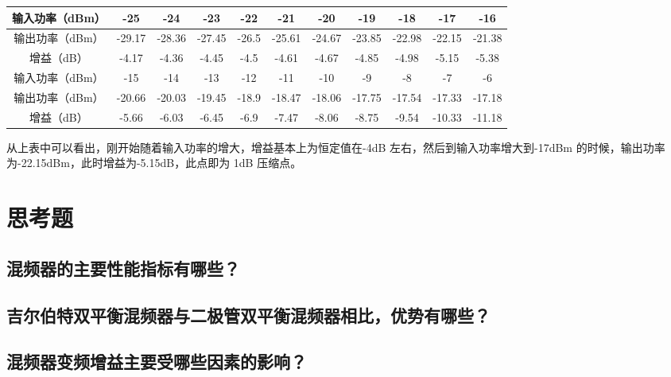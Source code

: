 \documentclass{../source/Experiment}
\begin{document}
\begin{table}[H]
    \begin{tabular}{|c|c|c|c|c|c|c|c|c|c|c|}
        \hline
        输入功率（dBm） & -25    & -24    & -23    & -22   & -21    & -20    & -19    & -18    & -17    & -16    \\ \hline
        输出功率（dBm） & -29.17 & -28.36 & -27.45 & -26.5 & -25.61 & -24.67 & -23.85 & -22.98 & -22.15 & -21.38 \\ \hline
        增益（dB）      & -4.17  & -4.36  & -4.45  & -4.5  & -4.61  & -4.67  & -4.85  & -4.98  & -5.15  & -5.38  \\ \hline
        输入功率（dBm） & -15    & -14    & -13    & -12   & -11    & -10    & -9     & -8     & -7     & -6     \\ \hline
        输出功率（dBm） & -20.66 & -20.03 & -19.45 & -18.9 & -18.47 & -18.06 & -17.75 & -17.54 & -17.33 & -17.18 \\ \hline
        增益（dB）      & -5.66  & -6.03  & -6.45  & -6.9  & -7.47  & -8.06  & -8.75  & -9.54  & -10.33 & -11.18 \\ \hline
    \end{tabular}
\end{table}

从上表中可以看出，刚开始随着输入功率的增大，增益基本上为恒定值在-4dB 左右，然后到输入功率增大到-17dBm 的时候，输出功率为-22.15dBm，此时增益为-5.15dB，此点即为 1dB 压缩点。
\section{思考题}
\subsection{混频器的主要性能指标有哪些？}

\subsection{吉尔伯特双平衡混频器与二极管双平衡混频器相比，优势有哪些？}

\subsection{混频器变频增益主要受哪些因素的影响？}
\end{document}
